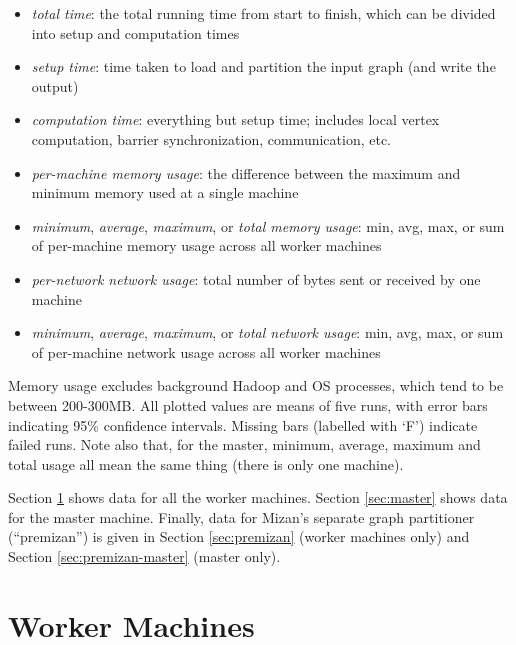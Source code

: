 \documentclass{article}
\newcommand{\bline}[1][1]{\vspace{#1\baselineskip}}
\begin{document}
\begin{itemize}
  \setlength{\itemsep}{-3pt}
\item \textit{total time}: the total running time from start to finish, which can be divided into setup and computation times
\item \textit{setup time}: time taken to load and partition the input graph (and write the output)
\item \textit{computation time}: everything but setup time; includes local vertex computation, barrier synchronization, communication, etc.
\bline[0.5]
\item \textit{per-machine memory usage}: the difference between the maximum and minimum memory used at a single machine
\item \textit{minimum}, \textit{average}, \textit{maximum}, or \textit{total memory usage}: min, avg, max, or sum of per-machine memory usage across all worker machines
\bline[0.5]
\item \textit{per-network network usage}: total number of bytes sent or received by one machine
\item \textit{minimum}, \textit{average}, \textit{maximum}, or \textit{total network usage}: min, avg, max, or sum of per-machine network usage across all worker machines
\end{itemize}

\noindent Memory usage excludes background Hadoop and OS processes, which tend to be between 200-300MB. All plotted values are means of five runs, with error bars indicating 95\% confidence intervals. Missing bars (labelled with `F') indicate failed runs. Note also that, for the master, minimum, average, maximum and total usage all mean the same thing (there is only one machine).

\bline
Section \ref{sec:workers} shows data for all the worker machines. Section \ref{sec:master} shows data for the master machine. Finally, data for Mizan's separate graph partitioner (``premizan'') is given in Section \ref{sec:premizan} (worker machines only) and Section \ref{sec:premizan-master} (master only).


\pagebreak
\section{Worker Machines}
\label{sec:workers}
\end{document}

